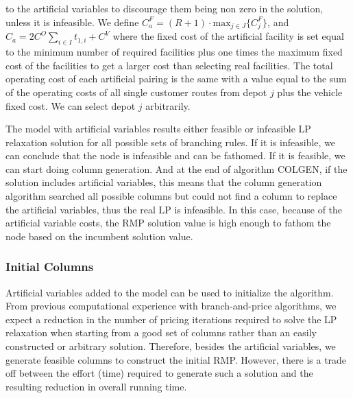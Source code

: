 to the artificial variables to discourage them being non zero in the solution, unless 
it is infeasible. We define $C^F_a = (R+1) \cdot \mbox{max}_{j \in J}\{C^F_j\}$, and
$C_{a} = 2C^O\sum_{i \in I}t_{1,i} + C^V$ where 
the fixed cost of the artificial facility is set equal to the minimum number of required facilities 
plus one times the maximum fixed cost of the facilities to get a larger cost than selecting
real facilities. The total operating cost of each artificial 
pairing is the same with  a value equal to the sum of the operating costs of all single 
customer routes from depot $j$ plus the vehicle fixed cost. We can select
depot $j$ arbitrarily. 
 
The model with artificial variables results either feasible or infeasible LP relaxation solution 
for all possible sets of branching rules. If it is infeasible, we can conclude that the 
node is infeasible and can be fathomed. If it is feasible, we can start doing column
generation. And at the end of algorithm COLGEN, if the solution includes 
artificial variables, this means that the column generation algorithm searched all possible 
columns but could not find a column to replace the artificial variables, thus
the real LP is infeasible. In this case, because of the artificial variable costs, the RMP 
solution value is high enough to fathom the node based on the incumbent solution value. 


\subsubsection{Initial Columns} 
\label{sec:initcols}
Artificial variables added to the model can be used to initialize the algorithm.
From previous computational experience with branch-and-price algorithms, 
we expect a reduction in the number of pricing iterations required to
solve the LP relaxation when starting from a good set of columns rather than an easily
constructed or arbitrary solution. Therefore, besides the artificial variables, 
we generate feasible columns to construct the initial RMP. However, there is a trade off 
between the effort (time) required to generate such a solution and the resulting reduction 
in overall running time. 

